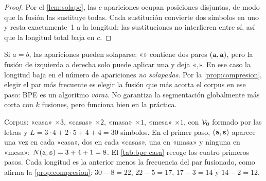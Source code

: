 \begin{proof}
Por el \cref{lem:solape}, las $c$ apariciones ocupan posiciones disjuntas, de modo que la fusión las sustituye todas. Cada sustitución convierte dos símbolos en uno y resta exactamente~1 a la longitud; las sustituciones no interfieren entre sí, así que la longitud total baja en $c$.
\end{proof}

\begin{observacion}
Si $a=b$, las apariciones pueden solaparse: «» contiene dos pares $(\texttt{a},\texttt{a})$, pero la fusión de izquierda a derecha solo puede aplicar una y deja «\sep{}». En ese caso la longitud baja en el número de apariciones \emph{no solapadas}. Por la \cref{prop:compresion}, elegir el par más frecuente es elegir la fusión que más acorta el corpus en ese paso: BPE es un algoritmo \emph{voraz}. No garantiza la segmentación globalmente más corta con $k$ fusiones, pero funciona bien en la práctica.
\end{observacion}

\begin{ejemplo}\label{ej:bpe-casa}
Corpus: «casa» $\times 3$, «casas» $\times 2$, «masa» $\times 1$, «mesa» $\times 1$, con $\mathcal{V}_0$ formado por las letras y $L=3\cdot 4+2\cdot 5+4+4=30$ símbolos. En el primer paso, $(\texttt{a},\texttt{s})$ aparece una vez en cada «casa», dos en cada «casas», una en «masa» y ninguna en «mesa»: $N(\texttt{a},\texttt{s})=3+4+1=8$. El \cref{tab:bpe-casa} recoge los cuatro primeros pasos. Cada longitud es la anterior menos la frecuencia del par fusionado, como afirma la \cref{prop:compresion}: $30-8=22$, $22-5=17$, $17-3=14$ y $14-2=12$.
\end{ejemplo}

